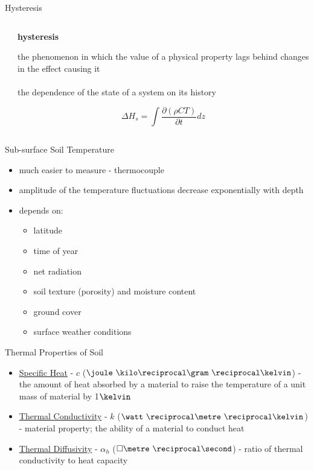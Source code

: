 \begin{frame}{Hysteresis}
\begin{columns}[T]
\begin{column}{.35\textwidth}
\begin{minipage}[c][0.8\textheight][c]{\linewidth}
    \end{minipage}
    \end{column}
    \begin{column}{.65\textwidth}
    \begin{minipage}[c][1\textheight][c]{\linewidth}
    {\large \textbf{hysteresis}}\\
    \begin{fancydefs}
    	the phenomenon in which the value of a physical property lags behind changes in the effect causing it\\~\\the dependence of the state of a system on its history
    \end{fancydefs}
    $$\Delta H_s = \int \frac{\partial (\rho C T)}{\partial t} dz$$
      \end{minipage}
    \end{column}
  \end{columns} 
\end{frame}

\begin{frame}{Sub-surface Soil Temperature}

\begin{itemize}
	\item much easier to measure - thermocouple
	\item amplitude of the temperature fluctuations decrease exponentially with depth 
	\item depends on:
	\begin{itemize}
		\item latitude
		\item time of year
		\item net radiation
		\item soil texture (porosity) and moisture content
		\item ground cover
		\item surface weather conditions
	\end{itemize}
\end{itemize}
\end{frame}

\begin{frame}{Thermal Properties of Soil}

\begin{itemize}
	\item \underline{Specific Heat} - $c$ ($\joule\  \kilo\reciprocal\gram\ \reciprocal\kelvin$) - the amount of heat absorbed by a material to raise the temperature of a unit mass of material by 1$\kelvin$
	\item \underline{Thermal Conductivity} - $k$ ($\watt\ \reciprocal\metre\ \reciprocal\kelvin$) - material property; the ability of a material to conduct heat
	\item \underline{Thermal Diffusivity} - $\alpha_h$ ($\square\metre\ \reciprocal\second$) - ratio of thermal conductivity to heat capacity
\end{itemize}
\end{frame}

